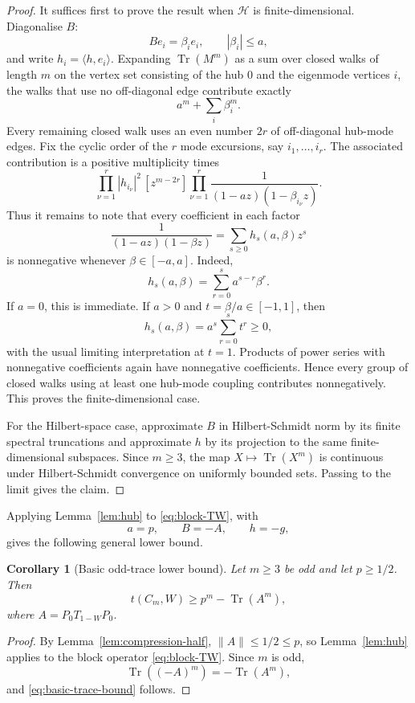 \documentclass[11pt]{article}
\newtheorem{corollary}[theorem]{Corollary}
\theoremstyle{definition}
\theoremstyle{remark}
\newcommand{\ip}[2]{\langle #1,#2\rangle}
\newcommand{\Tr}{\operatorname{Tr}}
\newcommand{\calH}{\mathcal H}
\begin{document}
\begin{proof}
It suffices first to prove the result when $\calH$ is finite-dimensional.  Diagonalise $B$:
\[
  B e_i=\beta_i e_i,
  \qquad |\beta_i|\le a,
\]
and write $h_i=\ip{h}{e_i}$.  Expanding $\Tr(M^m)$ as a sum over closed walks of length $m$ on the vertex set consisting of the hub $0$ and the eigenmode vertices $i$, the walks that use no off-diagonal edge contribute exactly
\[
  a^m+\sum_i\beta_i^m.
\]
Every remaining closed walk uses an even number $2r$ of off-diagonal hub-mode edges.  Fix the cyclic order of the $r$ mode excursions, say $i_1,\ldots,i_r$.  The associated contribution is a positive multiplicity times
\[
  \prod_{\nu=1}^r |h_{i_\nu}|^2
  \,[z^{m-2r}]
  \prod_{\nu=1}^r
  \frac{1}{(1-az)(1-\beta_{i_\nu}z)}.
\]
Thus it remains to note that every coefficient in each factor
\[
  \frac{1}{(1-az)(1-\beta z)}
  =\sum_{s\ge0} h_s(a,\beta)z^s
\]
is nonnegative whenever $\beta\in[-a,a]$.  Indeed,
\[
  h_s(a,\beta)=\sum_{r=0}^s a^{s-r}\beta^r.
\]
If $a=0$, this is immediate.  If $a>0$ and $t=\beta/a\in[-1,1]$, then
\[
  h_s(a,\beta)=a^s\sum_{r=0}^s t^r\ge0,
\]
with the usual limiting interpretation at $t=1$.  Products of power series with nonnegative coefficients again have nonnegative coefficients.  Hence every group of closed walks using at least one hub-mode coupling contributes nonnegatively.  This proves the finite-dimensional case.

For the Hilbert-space case, approximate $B$ in Hilbert-Schmidt norm by its finite spectral truncations and approximate $h$ by its projection to the same finite-dimensional subspaces.  Since $m\ge3$, the map $X\mapsto \Tr(X^m)$ is continuous under Hilbert-Schmidt convergence on uniformly bounded sets.  Passing to the limit gives the claim.
\end{proof}

Applying Lemma~\ref{lem:hub} to \eqref{eq:block-TW}, with
\[
  a=p,
  \qquad
  B=-A,
  \qquad
  h=-g,
\]
gives the following general lower bound.

\begin{corollary}[Basic odd-trace lower bound]\label{cor:basic-trace-bound}
Let $m\ge3$ be odd and let $p\ge1/2$.  Then
\begin{equation}\label{eq:basic-trace-bound}
  t(C_m,W)\ge p^m-\Tr(A^m),
\end{equation}
where $A=P_0T_{1-W}P_0$.
\end{corollary}

\begin{proof}
By Lemma~\ref{lem:compression-half}, $\|A\|\le1/2\le p$, so Lemma~\ref{lem:hub} applies to the block operator \eqref{eq:block-TW}.  Since $m$ is odd,
\[
  \Tr((-A)^m)=-\Tr(A^m),
\]
and \eqref{eq:basic-trace-bound} follows.
\end{proof}
\end{document}
